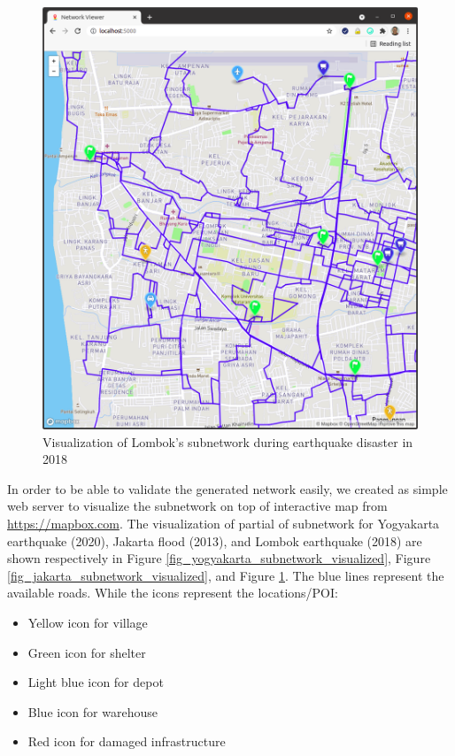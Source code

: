 \documentclass[conference]{IEEEtran}
\begin{document}
\begin{figure}
\centerline{\includegraphics[scale=0.24]{subnetwork-visualization-zoom-1-lombok.png}}
\caption{Visualization of Lombok's subnetwork during earthquake disaster in 2018}
\label{fig_lombok_subnetwork_visualized}
\end{figure}

In order to be able to validate the generated network easily, we created as simple web server to visualize the subnetwork on top of interactive map from \url{https://mapbox.com}. The visualization of partial of subnetwork for Yogyakarta earthquake (2020), Jakarta flood (2013), and Lombok earthquake (2018) are shown respectively in Figure \ref{fig_yogyakarta_subnetwork_visualized}, Figure \ref{fig_jakarta_subnetwork_visualized}, and Figure \ref{fig_lombok_subnetwork_visualized}. The blue lines represent the available roads. While the icons represent the locations/POI: 

\begin{itemize}
\item Yellow icon for village
\item Green icon for shelter
\item Light blue icon for depot
\item Blue icon for warehouse
\item Red icon for damaged infrastructure
\end{itemize}
\end{document}
